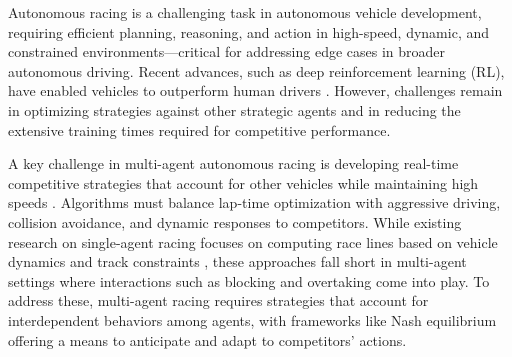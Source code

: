 Autonomous racing is a challenging task in autonomous vehicle development, requiring efficient planning, reasoning, and action in high-speed, dynamic, and constrained environments—critical for addressing edge cases in broader autonomous driving. Recent advances, such as deep reinforcement learning (RL), have enabled vehicles to outperform human drivers \citep{wurman2022outracing, kaufmann2023champion}. However, challenges remain in optimizing strategies against other strategic agents and in reducing the extensive training times required for competitive performance.




A key challenge in multi-agent autonomous racing is developing real-time competitive strategies that account for other vehicles while maintaining high speeds \citep{betz2022autonomous}. Algorithms must balance lap-time optimization with aggressive driving, collision avoidance, and dynamic responses to competitors. While existing research on single-agent racing focuses on computing race lines based on vehicle dynamics and track constraints \citep{rosolia2017autonomous, balaji2020deepracer, song2021autonomous, herman2021learn, liniger2015optimization, kabzan2020amz}, these approaches fall short in multi-agent settings where interactions such as blocking and overtaking come into play. To address these, multi-agent racing requires strategies that account for interdependent behaviors among agents, with frameworks like Nash equilibrium offering a means to anticipate and adapt to competitors' actions.

